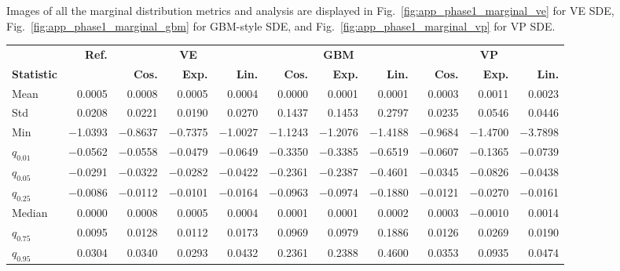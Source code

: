Images of all the marginal distribution metrics and analysis are displayed in Fig.\ \ref{fig:app_phase1_marginal_ve} for VE SDE, Fig.\ \ref{fig:app_phase1_marginal_gbm} for GBM-style SDE, and Fig.\ \ref{fig:app_phase1_marginal_vp} for VP SDE.
\begin{table}[hbpt]
\centering
\footnotesize
\renewcommand{\arraystretch}{1.28}
\setlength{\tabcolsep}{3pt}
\begin{tabular}{
  l
  r                  %
  r r r              %
  r r r              %
  r r r              %
}
\toprule
& {\textbf{Ref.}}
& \multicolumn{3}{c}{\textbf{VE}}
& \multicolumn{3}{c}{\textbf{GBM}}
& \multicolumn{3}{c}{\textbf{VP}} \\
\cmidrule(lr){3-5}\cmidrule(lr){6-8}\cmidrule(lr){9-11}
\textbf{Statistic}
  &
  & \textbf{Cos.} & \textbf{Exp.} & \textbf{Lin.}
  & \textbf{Cos.} & \textbf{Exp.} & \textbf{Lin.}
  & \textbf{Cos.} & \textbf{Exp.} & \textbf{Lin.} \\
\midrule
Mean        &  0.0005 &  0.0008 &  0.0005 &  0.0004 &  0.0000 &  0.0001 &  0.0001 &  0.0003 &  0.0011 &  0.0023 \\
Std         &  0.0208 &  0.0221 &  0.0190 &  0.0270 &  0.1437 &  0.1453 &  0.2797 &  0.0235 &  0.0546 & 0.0446 \\
Min         & $-$1.0393 & $-$0.8637 & $-$0.7375 & $-$1.0027 & $-$1.1243 & $-$1.2076 & $-$1.4188 & $-$0.9684 & $-$1.4700 & $-$3.7898 \\
$q_{0.01}$  & $-$0.0562 & $-$0.0558 & $-$0.0479 & $-$0.0649 & $-$0.3350 & $-$0.3385 & $-$0.6519 & $-$0.0607 & $-$0.1365 & $-$0.0739 \\
$q_{0.05}$  & $-$0.0291 & $-$0.0322 & $-$0.0282 & $-$0.0422 & $-$0.2361 & $-$0.2387 & $-$0.4601 & $-$0.0345 & $-$0.0826 & $-$0.0438 \\
$q_{0.25}$  & $-$0.0086 & $-$0.0112 & $-$0.0101 & $-$0.0164 & $-$0.0963 & $-$0.0974 & $-$0.1880 & $-$0.0121  & $-$0.0270 & $-$0.0161\\
Median      &  0.0000 &  0.0008 &  0.0005 &  0.0004 &  0.0001 &  0.0001 &  0.0002 &  0.0003 & $-$0.0010 & 0.0014 \\
$q_{0.75}$  &  0.0095 &  0.0128 &  0.0112 &  0.0173 &  0.0969 &  0.0979 &  0.1886 &  0.0126 &  0.0269 & 0.0190 \\
$q_{0.95}$  &  0.0304 &  0.0340 &  0.0293 &  0.0432 &  0.2361 &  0.2388 &  0.4600 & 0.0353 &  0.0935 &  0.0474 \\

\end{tabular}
\end{table}
